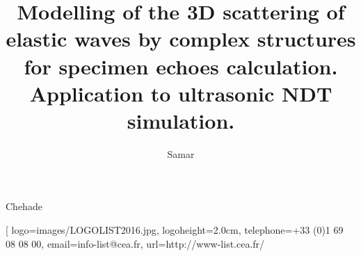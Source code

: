 \author[samar.chehade.sc@gmail.com]{Samar}{Chehade}
%
\title[Modélisation de la diffusion 3D d'ondes élastiques par des structures complexes pour le calcul des échos de géométrie. Application à la simulation des CND par ultrasons.]{Modelling of the 3D scattering of elastic waves by complex structures for specimen echoes calculation. Application to ultrasonic NDT simulation.}
%
%
%
%
%
%
\subject[Diffraction d'ondes élastiques]{Elastic wave diffraction}
%
%
%
%
%
\laboratory[
logo=images/LOGOLIST2016.jpg,
logoheight=2.0cm,
telephone=+33 (0)1 69 08 08 00,
email=info-list@cea.fr,
url=http://www-list.cea.fr/
